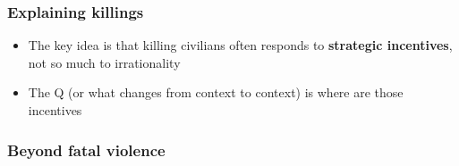 \documentclass[utf8, xcolor=dvipsnames, handout]{beamer}
\begin{document}
\begin{frame}
\frametitle{Explaining killings}
\centering

\begin{itemize}
  \item The key idea is that killing civilians often responds to \textbf{strategic incentives}, not so much to irrationality
  \item The Q (or what changes from context to context) is where are those incentives
\end{itemize}

\end{frame}

\begin{frame}
\frametitle{Beyond fatal violence}
\centering


\end{frame}
\end{document}

